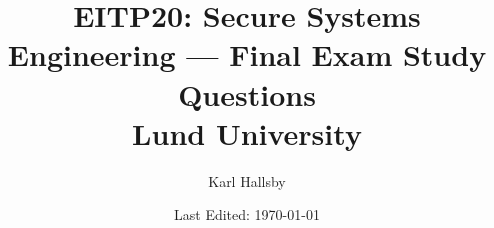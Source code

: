 


\graphicspath{{./Drawings/EITP20-Secure_Systems_Engineering}} %
% 


\begin{titlepage}
  \title{EITP20: Secure Systems Engineering --- Final Exam Study Questions \\ Lund University}
  \author{Karl Hallsby}
  \date{Last Edited: \today} %
\end{titlepage}


\maketitle
{} %
\tableofcontents
\clearpage
{} %













